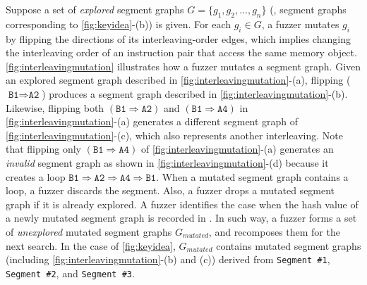 %
Suppose a set of \textit{explored} segment graphs
$G = \{g_1, g_2, ..., g_n \}$ (\eg, segment graphs corresponding to
\autoref{fig:keyidea}-(b)) is given.
%
For each $g_i \in G$, a fuzzer mutates $g_i$ by flipping the
directions of its interleaving-order edges, which implies changing the
interleaving order of an instruction pair that access the same memory
object.
%
\autoref{fig:interleavingmutation} illustrates how a fuzzer mutates a
segment graph.
%
Given an explored segment graph described in
\autoref{fig:interleavingmutation}-(a), flipping
($\texttt{B1} \Rightarrow \texttt{A2}$) produces a segment graph
described in \autoref{fig:interleavingmutation}-(b).
%
%
Likewise, flipping both $(\texttt{B1} \Rightarrow \texttt{A2})$ and
$(\texttt{B1} \Rightarrow \texttt{A4})$ in
\autoref{fig:interleavingmutation}-(a) generates a different segment graph
of \autoref{fig:interleavingmutation}-(c), which also represents
another interleaving.
%
Note that flipping only
$(\texttt{B1} \Rightarrow \texttt{A4})$  of
\autoref{fig:interleavingmutation}-(a) generates an \textit{invalid}
segment graph as shown in \autoref{fig:interleavingmutation}-(d)
because it creates a loop
$\texttt{B1} \Rightarrow \texttt{A2} \Rightarrow \texttt{A4}
\Rightarrow \texttt{B1}$.
%
%
When a mutated segment graph contains a loop, a fuzzer discards the
segment.
%
Also, a fuzzer drops a mutated segment graph if it is already
explored. A fuzzer identifies the case when the hash value of a newly
mutated segment graph is recorded in \intcov.
%
In such way, a fuzzer forms a set of \textit{unexplored} mutated
segment graphs $G_{mutated}$, and recomposes them for the next search.
%
In the case of \autoref{fig:keyidea}, $G_{mutated}$ contains mutated
segment graphs (including \autoref{fig:interleavingmutation}-(b) and
(c)) derived from \texttt{Segment \#1}, \texttt{Segment \#2}, and
\texttt{Segment \#3}.

